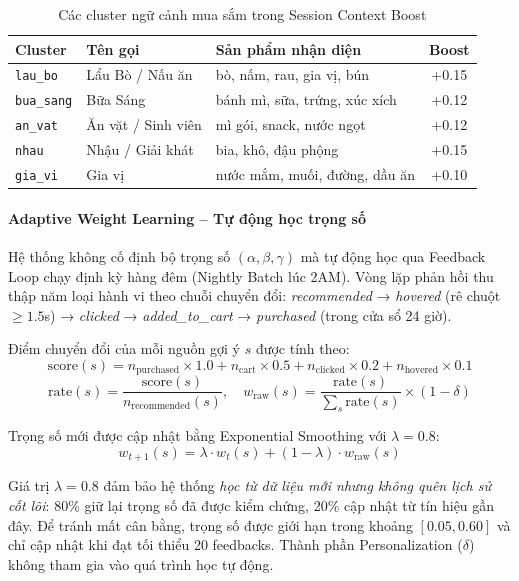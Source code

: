 \documentclass[12pt,a4paper]{report}
\begin{document}
\begin{table}[htbp]
\centering
\renewcommand{\arraystretch}{1.3}
\begin{tabular}{|l|l|l|c|}
\hline
\rowcolor[HTML]{EFEFEF}
\textbf{Cluster} & \textbf{Tên gọi} & \textbf{Sản phẩm nhận diện} & \textbf{Boost} \\ \hline
\texttt{lau\_bo} & Lẩu Bò / Nấu ăn & bò, nấm, rau, gia vị, bún & +0.15 \\ \hline
\texttt{bua\_sang} & Bữa Sáng & bánh mì, sữa, trứng, xúc xích & +0.12 \\ \hline
\texttt{an\_vat} & Ăn vặt / Sinh viên & mì gói, snack, nước ngọt & +0.12 \\ \hline
\texttt{nhau} & Nhậu / Giải khát & bia, khô, đậu phộng & +0.15 \\ \hline
\texttt{gia\_vi} & Gia vị & nước mắm, muối, đường, dầu ăn & +0.10 \\ \hline
\end{tabular}
\caption{Các cluster ngữ cảnh mua sắm trong Session Context Boost}
\label{tab:session_clusters}
\end{table}
 
\paragraph{Adaptive Weight Learning -- Tự động học trọng số}
 
Hệ thống không cố định bộ trọng số $(\alpha, \beta, \gamma)$ mà tự động học qua Feedback Loop chạy định kỳ hàng đêm (Nightly Batch lúc 2AM). Vòng lặp phản hồi thu thập năm loại hành vi theo chuỗi chuyển đổi: \textit{recommended} → \textit{hovered} (rê chuột $\geq 1.5$s) → \textit{clicked} → \textit{added\_to\_cart} → \textit{purchased} (trong cửa sổ 24 giờ).
 
Điểm chuyển đổi của mỗi nguồn gợi ý $s$ được tính theo:
\[
\text{score}(s) = n_{\text{purchased}} \times 1.0 + n_{\text{cart}} \times 0.5 + n_{\text{clicked}} \times 0.2 + n_{\text{hovered}} \times 0.1
\]
\[
\text{rate}(s) = \frac{\text{score}(s)}{n_{\text{recommended}}(s)}, \quad
w_{\text{raw}}(s) = \frac{\text{rate}(s)}{\sum_s \text{rate}(s)} \times (1 - \delta)
\]
 
Trọng số mới được cập nhật bằng Exponential Smoothing với $\lambda = 0.8$:
\[
w_{t+1}(s) = \lambda \cdot w_t(s) + (1 - \lambda) \cdot w_{\text{raw}}(s)
\]
 
Giá trị $\lambda = 0.8$ đảm bảo hệ thống \textit{học từ dữ liệu mới nhưng không quên lịch sử cốt lõi}: 80\% giữ lại trọng số đã được kiểm chứng, 20\% cập nhật từ tín hiệu gần đây. Để tránh mất cân bằng, trọng số được giới hạn trong khoảng $[0.05, 0.60]$ và chỉ cập nhật khi đạt tối thiểu 20 feedbacks. Thành phần Personalization ($\delta$) không tham gia vào quá trình học tự động.
 
\end{document}
